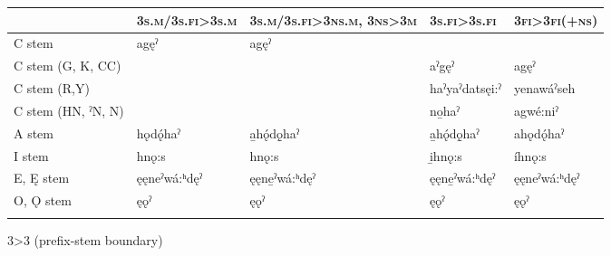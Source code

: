 \begin{sidewaysfigure}
\caption{\textsc{3>3} (prefix-stem boundary)}
\label{figtab:3on3.end}
{
\begin{tabularx}{\textwidth}{QQQQQ}
\lsptoprule
&\textsc{3s.m/3s.fi>3s.m}&\textsc{3s.m/3s.fi>3ns.m, 3ns>3m}&\textsc{3s.fi>3s.fi}&\textsc{3fi>3fi(+ns)}\\
\midrule
C stem&

agęˀ&

agęˀ&&\\
\tablevspace
C stem (G, K, CC)&&&

aˀgęˀ &

agęˀ\\
C stem (R,Y)&&&

haˀyaˀdatsęi:ˀ&

yenawáˀseh\\
C stem (HN, ˀN, N)&&&

no̱haˀ&

agwé:niˀ\\
\tablevspace
A stem&

hǫdǫ́haˀ&

a̱hǫ́dǫ̱haˀ&

a̱hǫ́dǫ̱haˀ&

ahǫdǫ́haˀ\\
\tablevspace
I stem&

hnǫ:s&

hnǫ:s&

i̱hnǫ:s&

íhnǫ:s\\
\tablevspace
E, Ę stem&

ęęneˀwá:ʰdęˀ&

ęęne̱ˀwá:ʰdęˀ&

ęęne̱ˀwá:ʰdęˀ&

ęęneˀwá:ʰdęˀ\\
\tablevspace
O, Ǫ stem&

ęǫˀ&

ęǫˀ&

ęǫˀ&

ęǫˀ\\
\lspbottomrule
\end{tabularx}}
\end{sidewaysfigure}

